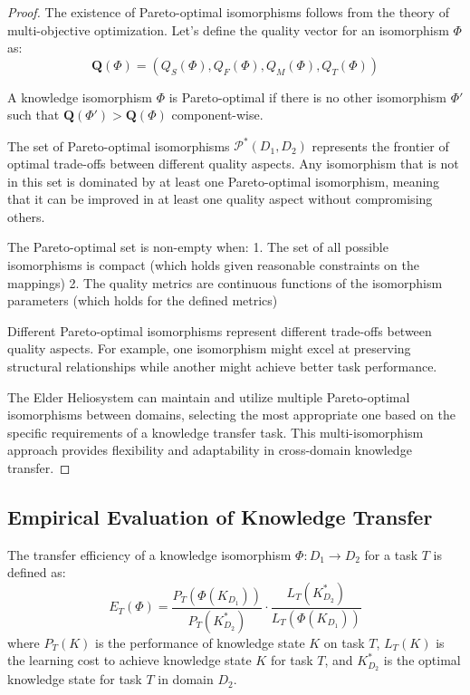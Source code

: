 \begin{proof}
The existence of Pareto-optimal isomorphisms follows from the theory of multi-objective optimization. Let's define the quality vector for an isomorphism $\Phi$ as:
\begin{equation}
\mathbf{Q}(\Phi) = (Q_S(\Phi), Q_F(\Phi), Q_M(\Phi), Q_T(\Phi))
\end{equation}

A knowledge isomorphism $\Phi$ is Pareto-optimal if there is no other isomorphism $\Phi'$ such that $\mathbf{Q}(\Phi') > \mathbf{Q}(\Phi)$ component-wise. 

The set of Pareto-optimal isomorphisms $\mathcal{P}^*(D_1, D_2)$ represents the frontier of optimal trade-offs between different quality aspects. Any isomorphism that is not in this set is dominated by at least one Pareto-optimal isomorphism, meaning that it can be improved in at least one quality aspect without compromising others.

The Pareto-optimal set is non-empty when:
1. The set of all possible isomorphisms is compact (which holds given reasonable constraints on the mappings)
2. The quality metrics are continuous functions of the isomorphism parameters (which holds for the defined metrics)

Different Pareto-optimal isomorphisms represent different trade-offs between quality aspects. For example, one isomorphism might excel at preserving structural relationships while another might achieve better task performance.

The Elder Heliosystem can maintain and utilize multiple Pareto-optimal isomorphisms between domains, selecting the most appropriate one based on the specific requirements of a knowledge transfer task. This multi-isomorphism approach provides flexibility and adaptability in cross-domain knowledge transfer.
\end{proof}

\subsection{Empirical Evaluation of Knowledge Transfer}

\begin{definition}
The transfer efficiency of a knowledge isomorphism $\Phi: D_1 \to D_2$ for a task $T$ is defined as:
\begin{equation}
E_T(\Phi) = \frac{P_T(\Phi(K_{D_1}))}{P_T(K_{D_2}^*)} \cdot \frac{L_T(K_{D_2}^*)}{L_T(\Phi(K_{D_1}))}
\end{equation}
where $P_T(K)$ is the performance of knowledge state $K$ on task $T$, $L_T(K)$ is the learning cost to achieve knowledge state $K$ for task $T$, and $K_{D_2}^*$ is the optimal knowledge state for task $T$ in domain $D_2$.
\end{definition}


